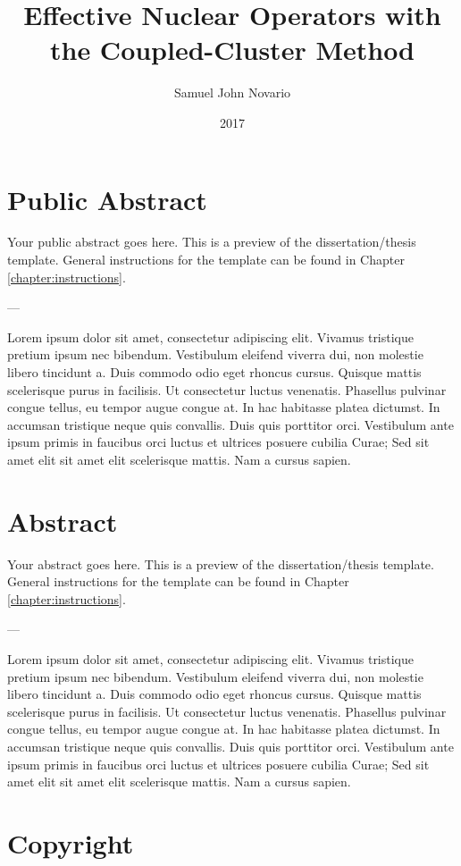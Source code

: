 \documentclass[dissertation]{msudissertation}
\author{Samuel John Novario}
\title{Effective Nuclear Operators with the Coupled-Cluster Method}
\date{2017}
\begin{document}
\frontmatter
\maketitle

\chapter{Public Abstract}

Your public abstract goes here.  This is a preview of the dissertation/thesis template.  General instructions for the template can be found in Chapter \ref{chapter:instructions}.

---

Lorem ipsum dolor sit amet, consectetur adipiscing elit. Vivamus tristique pretium ipsum nec bibendum. Vestibulum eleifend viverra dui, non molestie libero tincidunt a. Duis commodo odio eget rhoncus cursus. Quisque mattis scelerisque purus in facilisis. Ut consectetur luctus venenatis. Phasellus pulvinar congue tellus, eu tempor augue congue at. In hac habitasse platea dictumst. In accumsan tristique neque quis convallis. Duis quis porttitor orci. Vestibulum ante ipsum primis in faucibus orci luctus et ultrices posuere cubilia Curae; Sed sit amet elit sit amet elit scelerisque mattis. Nam a cursus sapien.

\chapter{Abstract}

Your abstract goes here.  This is a preview of the dissertation/thesis template.  General instructions for the template can be found in Chapter \ref{chapter:instructions}.

---

Lorem ipsum dolor sit amet, consectetur adipiscing elit. Vivamus tristique pretium ipsum nec bibendum. Vestibulum eleifend viverra dui, non molestie libero tincidunt a. Duis commodo odio eget rhoncus cursus. Quisque mattis scelerisque purus in facilisis. Ut consectetur luctus venenatis. Phasellus pulvinar congue tellus, eu tempor augue congue at. In hac habitasse platea dictumst. In accumsan tristique neque quis convallis. Duis quis porttitor orci. Vestibulum ante ipsum primis in faucibus orci luctus et ultrices posuere cubilia Curae; Sed sit amet elit sit amet elit scelerisque mattis. Nam a cursus sapien.

\chapter{Copyright}
\end{document}
